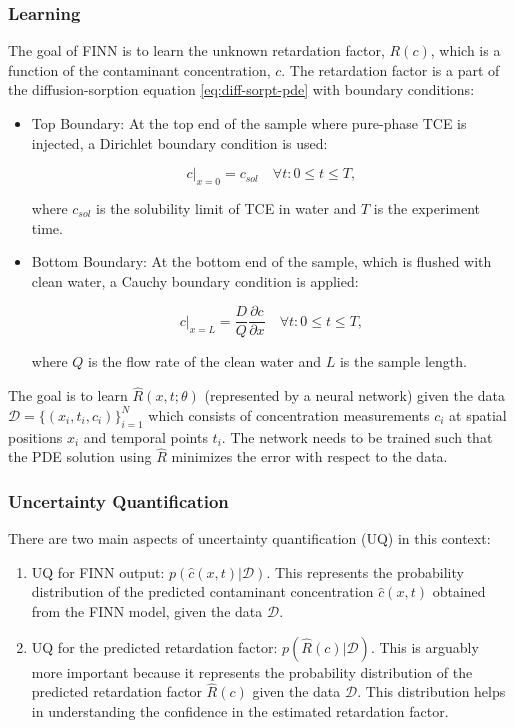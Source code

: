 \documentclass{article}
\begin{document}
\subsubsection{Learning}
The goal of FINN is to learn the unknown retardation factor, $R(c)$, which is a function of the contaminant concentration, $c$. The retardation factor is a part of the diffusion-sorption equation \eqref{eq:diff-sorpt-pde} with boundary conditions:

\begin{itemize}
    \item Top Boundary: At the top end of the sample where pure-phase TCE is injected, a Dirichlet boundary condition is used:

    \begin{equation}
        c|_{x=0} = c_{sol} \quad \forall t : 0 \leq t \leq T,
    \end{equation}

    where $c_{sol}$ is the solubility limit of TCE in water and $T$ is the experiment time.

    \item Bottom Boundary: At the bottom end of the sample, which is flushed with clean water, a Cauchy boundary condition is applied:

    \begin{equation}
        c|_{x=L} = \frac{D}{Q} \frac{\partial c}{\partial x} \quad \forall t : 0 \leq t \leq T,
    \end{equation}

    where $Q$ is the flow rate of the clean water and $L$ is the sample length.
\end{itemize}

The goal is to learn $\hat{R}(x,t;\theta)$ (represented by a neural network) given the data $\mathcal{D} = \{ (x_i, t_i, c_i) \}_{i=1}^N$ which consists of concentration measurements $c_i$ at spatial positions $x_i$ and temporal points $t_i$. The network needs to be trained such that the PDE solution using $\hat{R}$ minimizes the error with respect to the data.

\subsubsection{Uncertainty Quantification}
There are two main aspects of uncertainty quantification (UQ) in this context:
\begin{enumerate}
    \item UQ for FINN output: $p(\hat{c}(x,t) | \mathcal{D})$. This represents the probability distribution of the predicted contaminant concentration $\hat{c}(x,t)$ obtained from the FINN model, given the data $\mathcal{D}$.
    \item UQ for the predicted retardation factor: $p(\hat{R}(c) | \mathcal{D})$. This is arguably more important because it represents the probability distribution of the predicted retardation factor $\hat{R}(c)$ given the data $\mathcal{D}$. This distribution helps in understanding the confidence in the estimated retardation factor.
\end{enumerate}
\end{document}
